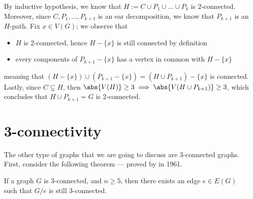 \documentclass[a4paper, 12pt]{report}
\begin{document}
{        By inductive hypothesis, we know that $H := C \cup P_1 \cup \ldots \cup P_k$ is 2-connected. Moreover, since $C, P_1, \ldots, P_{k + 1}$ is an ear decomposition, we know that $P_{k + 1}$ is an $H$-path. Fix $x \in V(G)$; we observe that

        \begin{itemize}
            \item $H$ is 2-connected, hence $H - \{x\}$ is still connected by definition
            \item every components of $P_{k + 1} - \{x\}$ has a vertex in common with $H - \{x\}$
        \end{itemize}

        meaning that $(H - \{x\}) \cup (P_{k + 1} - \{x\}) = (H \cup P_{k + 1}) - \{x\}$ is connected. Lastly, since $C \subsetneq H$, then $\abs {V(H)} \ge 3 \implies \abs{V(H \cup P_{k  + 1})} \ge 3$, which concludes that $H \cup P_{k + 1} = G$ is 2-connected.
    }

    \section{3-connectivity}

    The other type of graphs that we are going to discuss are 3-connected graphs. First, consider the following theorem --- proved by \textcite{tutte3conn} in 1961.

    \begin{framedthm}{}
        If a graph $G$ is 3-connected, and $n \ge 5$, then there exists an edge $e \in E(G)$ such that $G/e$ is still 3-connected.
    \end{framedthm}
\end{document}
